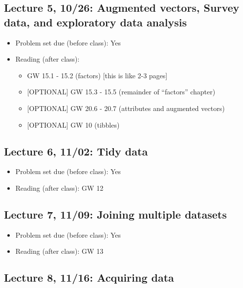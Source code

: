 \documentclass[11pt,]{article}
\providecommand{\tightlist}{%
  \setlength{\itemsep}{0pt}\setlength{\parskip}{0pt}}
\begin{document}
\subsection{Lecture 5, 10/26: Augmented vectors, Survey data, and
exploratory data
analysis}\label{lecture-5-1026-augmented-vectors-survey-data-and-exploratory-data-analysis}

\begin{itemize}
\tightlist
\item
  Problem set due (before class): Yes
\item
  Reading (after class):

  \begin{itemize}
  \tightlist
  \item
    GW 15.1 - 15.2 (factors) {[}this is like 2-3 pages{]}
  \item
    {[}OPTIONAL{]} GW 15.3 - 15.5 (remainder of ``factors'' chapter)
  \item
    {[}OPTIONAL{]} GW 20.6 - 20.7 (attributes and augmented vectors)
  \item
    {[}OPTIONAL{]} GW 10 (tibbles)
  \end{itemize}
\end{itemize}

\subsection{Lecture 6, 11/02: Tidy data}\label{lecture-6-1102-tidy-data}

\begin{itemize}
\tightlist
\item
  Problem set due (before class): Yes
\item
  Reading (after class): GW 12
\end{itemize}

\subsection{Lecture 7, 11/09: Joining multiple
datasets}\label{lecture-7-1109-joining-multiple-datasets}

\begin{itemize}
\tightlist
\item
  Problem set due (before class): Yes
\item
  Reading (after class): GW 13
\end{itemize}

\subsection{Lecture 8, 11/16: Acquiring
data}\label{lecture-8-1116-acquiring-data}
\end{document}
